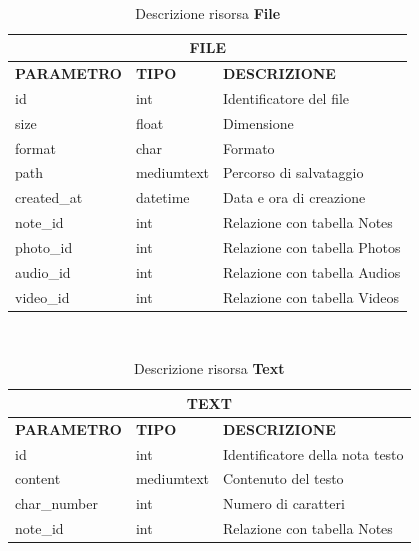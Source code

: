 \ \linebreak
\begin{table}[!h]
\centering
	\begin{tabular}{@{}lll@{}}
		\toprule
		\multicolumn{3}{c}{\textbf{FILE}}                                                                                     \\ \midrule
		\textbf{PARAMETRO} & \textbf{TIPO} & \textbf{DESCRIZIONE} \\ \midrule
		id                                     & int                               & Identificatore del file                  \\ 
		size                                   & float                             & Dimensione                               \\
		format                                 & char                              & Formato                                  \\
		path                                   & mediumtext                        & Percorso di salvataggio                  \\
		created\_at                            & datetime                          & Data e ora di creazione                  \\
		note\_id                               & int                               & Relazione con tabella Notes               \\
		photo\_id                              & int                               & Relazione con tabella Photos              \\
		audio\_id                              & int                               & Relazione con tabella Audios              \\
		video\_id                              & int                               & Relazione con tabella Videos              \\ \bottomrule
	\end{tabular}
\caption{Descrizione risorsa \textbf{File}}\label{etichetta}
\end{table}

\ \linebreak
\begin{table}[!h]
\centering
	\begin{tabular}{@{}lll@{}}
		\toprule
		\multicolumn{3}{c}{\textbf{TEXT}}                                    \\ \midrule
		\textbf{PARAMETRO} & \textbf{TIPO} & \textbf{DESCRIZIONE}            \\
		id                 & int           & Identificatore della nota testo \\
		content            & mediumtext    & Contenuto del testo             \\
		char\_number       & int           & Numero di caratteri             \\
		note\_id           & int           & Relazione con tabella Notes      \\ \bottomrule
	\end{tabular}
\caption{Descrizione risorsa \textbf{Text}}\label{etichetta}
\end{table}


